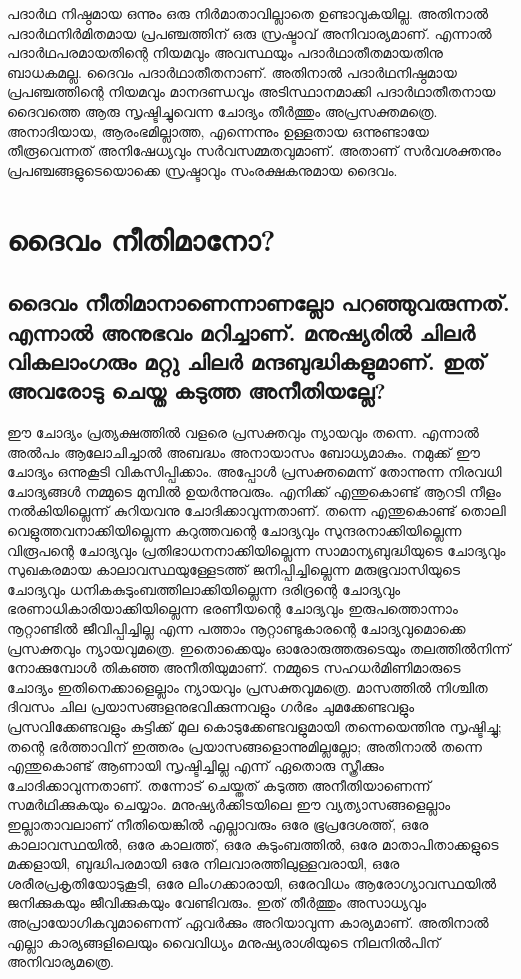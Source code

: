 പദാര്‍ഥ നിഷ്ഠമായ ഒന്നും ഒരു നിര്‍മാതാവില്ലാതെ ഉണ്ടാവുകയില്ല. അതിനാല്‍ പദാര്‍ഥനിര്‍മിതമായ പ്രപഞ്ചത്തിന് ഒരു സ്രഷ്ടാവ് അനിവാര്യമാണ്. എന്നാല്‍ പദാര്‍ഥപരമായതിന്റെ നിയമവും അവസ്ഥയും പദാര്‍ഥാതീതമായതിനു ബാധകമല്ല. ദൈവം പദാര്‍ഥാതീതനാണ്. അതിനാല്‍ പദാര്‍ഥനിഷ്ഠമായ പ്രപഞ്ചത്തിന്റെ നിയമവും മാനദണ്ഡവും അടിസ്ഥാനമാക്കി പദാര്‍ഥാതീതനായ ദൈവത്തെ ആരു സൃഷ്ടിച്ചുവെന്ന ചോദ്യം തീര്‍ത്തും അപ്രസക്തമത്രെ. അനാദിയായ, ആരംഭമില്ലാത്ത, എന്നെന്നും ഉള്ളതായ ഒന്നുണ്ടായേ തീരൂവെന്നത് അനിഷേധ്യവും സര്‍വസമ്മതവുമാണ്. അതാണ് സര്‍വശക്തനും പ്രപഞ്ചങ്ങളുടെയൊക്കെ സ്രഷ്ടാവും സംരക്ഷകനുമായ ദൈവം.
\chapter{ദൈവം നീതിമാനോ? }
  \section{ദൈവം നീതിമാനാണെന്നാണല്ലോ പറഞ്ഞുവരുന്നത്. എന്നാല്‍ അനുഭവം മറിച്ചാണ്. മനുഷ്യരില്‍ ചിലര്‍ വികലാംഗരും മറ്റു ചിലര്‍ മന്ദബുദ്ധികളുമാണ്. ഇത് അവരോടു ചെയ്ത കടുത്ത അനീതിയല്ലേ?}
 ഈ ചോദ്യം പ്രത്യക്ഷത്തില്‍ വളരെ പ്രസക്തവും ന്യായവും തന്നെ. എന്നാല്‍ അല്‍പം ആലോചിച്ചാല്‍ അബദ്ധം അനായാസം ബോധ്യമാകും. നമുക്ക് ഈ ചോദ്യം ഒന്നുകൂടി വികസിപ്പിക്കാം. അപ്പോള്‍ പ്രസക്തമെന്ന് തോന്നുന്ന നിരവധി ചോദ്യങ്ങള്‍ നമ്മുടെ മുമ്പില്‍ ഉയര്‍ന്നുവരും. എനിക്ക് എന്തുകൊണ്ട് ആറടി നീളം നല്‍കിയില്ലെന്ന് കുറിയവനു ചോദിക്കാവുന്നതാണ്. തന്നെ എന്തുകൊണ്ട് തൊലി വെളുത്തവനാക്കിയില്ലെന്ന കറുത്തവന്റെ ചോദ്യവും സുന്ദരനാക്കിയില്ലെന്ന വിരൂപന്റെ ചോദ്യവും പ്രതിഭാധനനാക്കിയില്ലെന്ന സാമാന്യബുദ്ധിയുടെ ചോദ്യവും സുഖകരമായ കാലാവസ്ഥയുള്ളേടത്ത് ജനിപ്പിച്ചില്ലെന്ന മരുഭൂവാസിയുടെ ചോദ്യവും ധനികകുടുംബത്തിലാക്കിയില്ലെന്ന ദരിദ്രന്റെ ചോദ്യവും ഭരണാധികാരിയാക്കിയില്ലെന്ന ഭരണീയന്റെ ചോദ്യവും ഇരുപത്തൊന്നാം നൂറ്റാണ്ടില്‍ ജീവിപ്പിച്ചില്ല എന്ന പത്താം നൂറ്റാണ്ടുകാരന്റെ ചോദ്യവുമൊക്കെ പ്രസക്തവും ന്യായവുമത്രെ. ഇതൊക്കെയും ഓരോരുത്തരുടെയും തലത്തില്‍നിന്ന് നോക്കുമ്പോള്‍ തികഞ്ഞ അനീതിയുമാണ്. നമ്മുടെ സഹധര്‍മിണിമാരുടെ ചോദ്യം ഇതിനെക്കാളെല്ലാം ന്യായവും പ്രസക്തവുമത്രെ. മാസത്തില്‍ നിശ്ചിത ദിവസം ചില പ്രയാസങ്ങളനുഭവിക്കുന്നവളും ഗര്‍ഭം ചുമക്കേണ്ടവളും പ്രസവിക്കേണ്ടവളും കുട്ടിക്ക് മുല കൊടുക്കേണ്ടവളുമായി തന്നെയെന്തിനു സൃഷ്ടിച്ചു; തന്റെ ഭര്‍ത്താവിന് ഇത്തരം പ്രയാസങ്ങളൊന്നുമില്ലല്ലോ; അതിനാല്‍ തന്നെ എന്തുകൊണ്ട് ആണായി സൃഷ്ടിച്ചില്ല എന്ന് ഏതൊരു സ്ത്രീക്കും ചോദിക്കാവുന്നതാണ്. തന്നോട് ചെയ്തത് കടുത്ത അനീതിയാണെന്ന് സമര്‍ഥിക്കുകയും ചെയ്യാം. മനുഷ്യര്‍ക്കിടയിലെ ഈ വ്യത്യാസങ്ങളെല്ലാം ഇല്ലാതാവലാണ് നീതിയെങ്കില്‍ എല്ലാവരും ഒരേ ഭൂപ്രദേശത്ത്, ഒരേ കാലാവസ്ഥയില്‍, ഒരേ കാലത്ത്, ഒരേ കുടുംബത്തില്‍, ഒരേ മാതാപിതാക്കളുടെ മക്കളായി, ബുദ്ധിപരമായി ഒരേ നിലവാരത്തിലുള്ളവരായി, ഒരേ ശരീരപ്രകൃതിയോടുകൂടി, ഒരേ ലിംഗക്കാരായി, ഒരേവിധം ആരോഗ്യാവസ്ഥയില്‍ ജനിക്കുകയും ജീവിക്കുകയും വേണ്ടിവരും. ഇത് തീര്‍ത്തും അസാധ്യവും അപ്രായോഗികവുമാണെന്ന് ഏവര്‍ക്കും അറിയാവുന്ന കാര്യമാണ്. അതിനാല്‍ എല്ലാ കാര്യങ്ങളിലെയും വൈവിധ്യം മനുഷ്യരാശിയുടെ നിലനില്‍പിന് അനിവാര്യമത്രെ.
